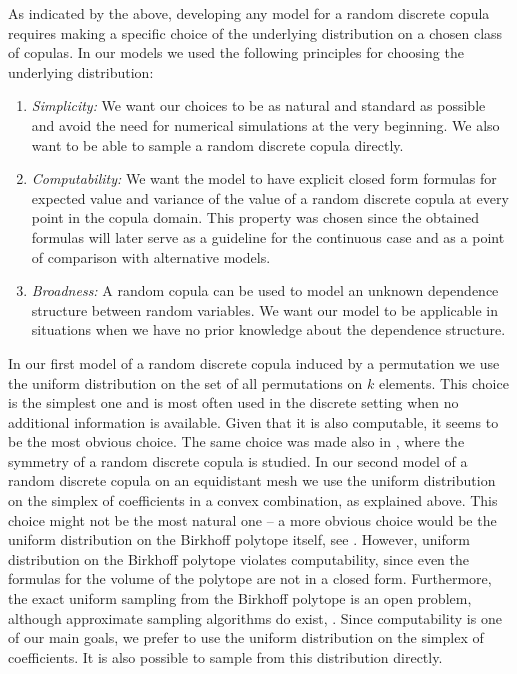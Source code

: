 \documentclass[12pt,a4paper]{amsart}
\theoremstyle{definition}
\begin{document}
As indicated by the above, developing any model for a random discrete copula requires making a specific choice of the underlying distribution on a chosen class of copulas. In our models we used the following principles for choosing the underlying distribution:
\begin{enumerate}[(P1)]
    \item \emph{Simplicity:} We want our choices to be as natural and standard  as possible and avoid the need for numerical simulations at the very beginning. We also want to be able to sample a random discrete copula directly. 
    \item \emph{Computability:} We want the model to have explicit closed form formulas for expected value and variance of the value of a random discrete copula at every point in the copula domain. This property was chosen since the obtained formulas will later serve as a guideline for the continuous case and as a point of comparison with alternative models.
    \item \emph{Broadness:} A random copula can be used to model an unknown dependence structure between random variables. We want our model to be applicable in situations when we have no prior knowledge about the dependence structure.
\end{enumerate}

In our first model of a random discrete copula induced by a permutation we use the uniform distribution on the set of all permutations on $k$ elements. This choice is the simplest one and is most often used in the discrete setting when no additional information is available. Given that it is also computable, it seems to be the most obvious choice. 
The same choice was made also in \cite{ErGoNe08}, where the symmetry of a random discrete copula is studied. In our second model of a random discrete copula on an equidistant mesh we use the uniform distribution on the simplex of coefficients in a convex combination, as explained above. 
This choice might not be the most natural one -- a more obvious choice would be the uniform distribution on the Birkhoff polytope itself, see \cite{ChaDiaSly10}. However, uniform distribution on the Birkhoff polytope violates computability, since even the formulas for the volume of the polytope are not in a closed form. Furthermore, the exact uniform sampling from the Birkhoff polytope is an open problem, although approximate sampling algorithms do exist, \cite{CapSomBruZyc09}. Since computability is one of our main goals, we prefer to use the uniform distribution on the simplex of coefficients. It is also possible to sample from this distribution directly.
\end{document}
